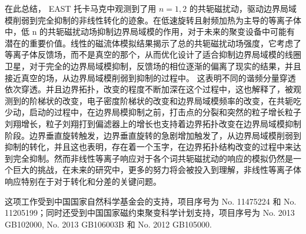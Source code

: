 
在此总结， EAST 托卡马克中观测到了用 $n=1,2$ 的共轭磁扰动，驱动边界局域模削弱到完全抑制的非线性转化的迹象。在低速旋转且射频加热为主导的等离子体中，低 n 的共轭磁扰动场抑制边界局域模的作用，对于未来的聚变设备中可能有潜在的重要价值。线性的磁流体模拟结果揭示了总的共轭磁扰动场强度，它考虑了等离子体反馈场，而不是真空的那个，从而优化设计了适合抑制边界局域模的线圈卫星，对于完全的边界局域模抑制，反馈场的相位逐渐的偏离了现实的结果，并且接近真空的场，从边界局域模削弱到抑制的过程中。
这表明不同的谐频分量穿透依次穿透。并且边界拓扑，改变的程度不断加深在这个过程中，这也解释了，被观测到的阶梯状的改变，电子密度阶梯状的改变和边界局域模频率的改变，在共轭吃少动，启动的过程中，在边界局模抑制之前，打击点的分裂和突然的粒子增长粒子刘翔增长，粒子刘翔打到偏滤器上的增长也支持着边界拓扑改变在边界局域模抑制阶段。边界垂直旋转触发，边界垂直旋转的急剧增加触发了，从边界局域模削弱到抑制的转化，并且这也表明，存在着一个玉字，在边界拓扑结构改变的过程中来达到完全抑制。然而非线性等离子响应对于各个词共轭磁扰动的响应的模拟仍然是一个巨大的挑战，在未来的研究中，更多的努力将会被投入到理解，非线性等离子体响应特别在于对于转化和分差的关键问题。

这项工作受到中国国家自然科学基金会的支持，项目序号为 No. 11475224 和 No. 11205199；同时还受到中国国家磁约束聚变科学计划支持，项目序号为 No. 2013 GB102000, No. 2013 GB106003B 和 No. 2012 GB105000.

